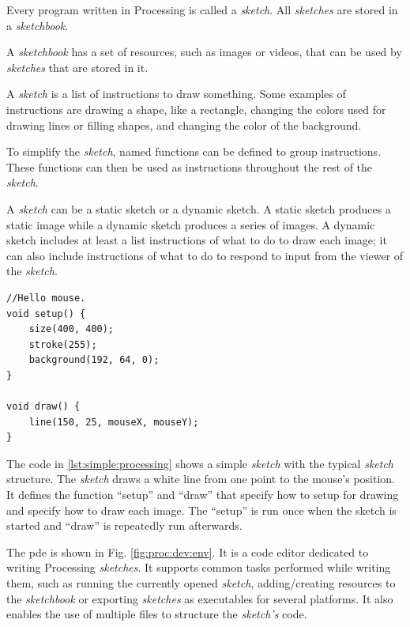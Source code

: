 \documentclass{./llncs2e/llncs}
\begin{document}
	Every program written in Processing is called a \emph{sketch}. 
	All \emph{sketches} are stored in a \emph{sketchbook}.
	
	A \emph{sketchbook} has a set of resources, such as images or videos, that can be used by \emph{sketches} that are stored in it.
	
	A \emph{sketch} is a list of instructions to draw something. 
	Some examples of instructions are drawing a shape, like a rectangle, changing the colors used for drawing lines or filling shapes, and changing the color of the background.
	
	To simplify the \emph{sketch}, named functions can be defined to group instructions. 
	These functions can then be used as instructions throughout the rest of the \emph{sketch}.
	
	A \emph{sketch} can be a static sketch or a dynamic sketch. 
	A static sketch produces a static image while a dynamic sketch produces a series of images. 
	A dynamic sketch includes at least a list instructions of what to do to draw each image; it can also include instructions of what to do to respond to input from the viewer of the \emph{sketch}.
	
	\lstset{ %
		basicstyle=\tt\small,
		numbers=left,
		numberstyle=\tt\small,
		frame=lines,
	}
	\begin{lstlisting}[caption={A simple Processing sketch.},label={lst:simple:processing},float]
//Hello mouse.
void setup() {
	size(400, 400);
	stroke(255);
	background(192, 64, 0);
}

void draw() {
	line(150, 25, mouseX, mouseY);
}
	\end{lstlisting}
	
	The code in \ref{lst:simple:processing} shows a simple \emph{sketch} with the typical \emph{sketch} structure. 
	The \emph{sketch} draws a white line from one point to the mouse's position. 
	It defines the function ``setup'' and  ``draw'' that specify how to setup for drawing and specify how to draw each image. 
	The ``setup'' is run once when the sketch is started and ``draw'' is repeatedly run afterwards.
	
	The \ac{pde} is shown in Fig. \ref{fig:proc:dev:env}. 
	It is a code editor dedicated to writing Processing \emph{sketches}. 
	It supports common tasks performed while writing them, such as running the currently opened \emph{sketch}, adding/creating resources to the \emph{sketchbook} or exporting \emph{sketches} as executables for several platforms. 
	It also enables the use of multiple files to structure the \emph{sketch's} code.
	
\end{document}
